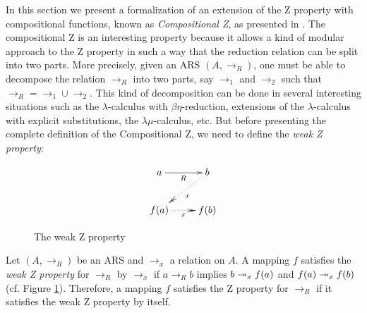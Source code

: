     In this section we present a formalization of an extension of the
    Z property with compositional functions, known as \textit{Compositional
    Z}, as presented in \cite{Nakazawa-Fujita2016}. The
    compositional Z is an interesting property because it allows a
    kind of modular approach to the Z property in such a way that the
    reduction relation can be split into two parts. More precisely,
    given an ARS $(A,\to_R)$, one must be able to decompose the
    relation $\to_R$ into two parts, say $\to_1$ and $\to_2$ such that
    $\to_R = \to_1\cup \to_2$. This kind of decomposition can be done
    in several interesting situations such as the $\lambda$-calculus
    with $\beta\eta$-reduction\cite{Ba84}, extensions of the
    $\lambda$-calculus with explicit substitutions\cite{accl91}, the
    $\lambda\mu$-calculus\cite{Parigot92}, etc. But before
    presenting the complete definition of the Compositional Z, we need
    to define the \textit{weak Z property}:


    \begin{figure}[h] \centering \[ \xymatrix{ a \ar[r]_R & b
        \ar@{.>>}[dl]^x\\ f(a) \ar@{.>>}[r]_x & f(b) \\ } \]
        \caption{The weak Z property}\label{fig:weakZ} \end{figure}


    \begin{definition} Let $(A,\to_R)$ be an ARS and $\to_x$ a
     relation on $A$. A mapping $f$ satisfies the {\it weak Z
     property} for $\to_R$ by $\to_x$ if $a\to_R b$ implies $b \twoheadrightarrow_x
     f(a)$ and $f(a) \twoheadrightarrow_x f(b)$ (cf. Figure
     \ref{fig:weakZ}). Therefore, a mapping $f$ satisfies the Z
     property for $\to_R$ if it satisfies the weak Z property by
     itself.  \end{definition}


